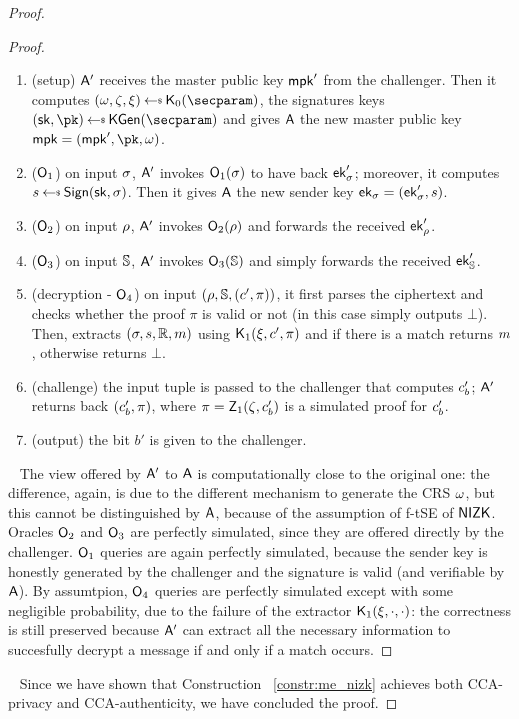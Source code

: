 \begin{proof}
\begin{lemma}
\begin{proof}
            \begin{enumerate}
                \item (setup) $\mathsf{A}'$ receives the master public key $\mathsf{mpk}'$ from the challenger. Then it computes $(\crs,\tpsim,\tpext)\getsr\nizkext_0(\secparam)$, the signatures keys $(\sk, \pk) \getsr \kgen(\secparam)$ and gives $\mathsf{A}$ the new master public key $\mpk = (\mpk', \pk, \crs)$.
                \item ($\mathsf{O}_1$) on input $\sigma$, $\mathsf{A}'$ invokes $\mathsf{O}_1(\sigma)$ to have back $\mathsf{ek}'_\sigma$; moreover, it computes $\signature \getsr \sign(\sk, \sattr)$. Then it gives $\mathsf{A}$ the new sender key $\mathsf{ek}_\sigma = (\mathsf{ek}'_\sigma, s)$.
                \item ($\mathsf{O}_2$) on input $\rho$, $\mathsf{A}'$ invokes $\mathsf{O}_2(\rho)$ and forwards the received $\mathsf{ek}'_\rho$.
                \item ($\mathsf{O}_3$) on input $\mathbb{S}$, $\mathsf{A}'$ invokes $\mathsf{O}_3(\mathbb{S})$ and simply forwards the received $\mathsf{ek}'_{\mathbb{S}}$.
                \item (decryption - $\mathsf{O}_4$) on input $(\rho, \mathbb{S}, (c', \pi))$, it first parses the ciphertext and checks whether the proof $\pi$ is valid or not (in this case simply outputs $\bot$). Then, extracts $(\sigma, s, \mathbb{R}, m)$ using $\mathsf{K}_1(\xi,c',\pi)$ and if there is a match returns $m$, otherwise returns $\bot$.
                \item (challenge) the input tuple is passed to the challenger that computes $c'_b$; $\mathsf{A}'$ returns back $(c'_b, \pi)$, where $\pi = \mathsf{Z}_1(\zeta, c'_b)$ is a simulated proof for $c'_b$.
                \item (output) the bit $b'$ is given to the challenger.
            \end{enumerate}
            ~\newline
            The view offered by $\mathsf{A}'$ to $\mathsf{A}$ is computationally close to the original one: the difference, again, is due to the different mechanism to generate the CRS $\omega$, but this cannot be distinguished by $\mathsf{A}$, because of the assumption of f-tSE of $\mathsf{NIZK}$.
            Oracles $\mathsf{O}_2$ and $\mathsf{O}_3$ are perfectly simulated, since they are offered directly by the challenger.
            $\mathsf{O}_1$ queries are again perfectly simulated, because the sender key is honestly generated by the challenger and the signature is valid (and verifiable by $\mathsf{A}$).
            By assumtpion, $\mathsf{O}_4$ queries are perfectly simulated except with some negligible probability, due to the failure of the extractor $\mathsf{K}_1(\xi, \cdot, \cdot)$: the correctness is still preserved because $\mathsf{A}'$ can extract all the necessary information to succesfully decrypt a message if and only if a match occurs.
        \end{proof}
    \end{lemma}
    ~\newline
    Since we have shown that Construction ~\ref{constr:me_nizk} achieves both CCA-privacy and CCA-authenticity, we have concluded the proof.
\end{proof}